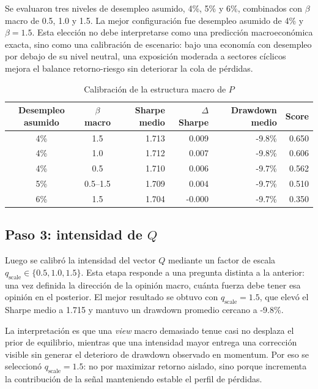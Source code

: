 \documentclass[11pt]{article}
\begin{document}
Se evaluaron tres niveles de desempleo asumido, 4\%, 5\% y 6\%, combinados con $\beta$ macro de 0.5, 1.0 y 1.5. La mejor configuraci\'on fue desempleo asumido de 4\% y $\beta=1.5$. Esta elecci\'on no debe interpretarse como una predicci\'on macroecon\'omica exacta, sino como una calibraci\'on de escenario: bajo una econom\'ia con desempleo por debajo de su nivel neutral, una exposici\'on moderada a sectores c\'iclicos mejora el balance retorno-riesgo sin deteriorar la cola de p\'erdidas.

\begin{table}[H]
\centering
\caption{Calibraci\'on de la estructura macro de $P$}
\label{tab:estructura_p}
\begin{tabular}{c c r r r r}
\toprule
Desempleo asumido & $\beta$ macro & Sharpe medio & $\Delta$ Sharpe & Drawdown medio & Score \\
\midrule
4\% & 1.5 & 1.713 & 0.009 & -9.8\% & 0.650 \\
4\% & 1.0 & 1.712 & 0.007 & -9.8\% & 0.606 \\
4\% & 0.5 & 1.710 & 0.006 & -9.7\% & 0.562 \\
5\% & 0.5--1.5 & 1.709 & 0.004 & -9.7\% & 0.510 \\
6\% & 1.5 & 1.704 & -0.000 & -9.7\% & 0.350 \\
\bottomrule
\end{tabular}
\end{table}

\subsection{Paso 3: intensidad de $Q$}

Luego se calibr\'o la intensidad del vector $Q$ mediante un factor de escala $q_{\text{scale}} \in \{0.5,1.0,1.5\}$. Esta etapa responde a una pregunta distinta a la anterior: una vez definida la direcci\'on de la opini\'on macro, cu\'anta fuerza debe tener esa opini\'on en el posterior. El mejor resultado se obtuvo con $q_{\text{scale}}=1.5$, que elev\'o el Sharpe medio a 1.715 y mantuvo un drawdown promedio cercano a -9.8\%.

La interpretaci\'on es que una \textit{view} macro demasiado tenue casi no desplaza el prior de equilibrio, mientras que una intensidad mayor entrega una correcci\'on visible sin generar el deterioro de drawdown observado en momentum. Por eso se seleccion\'o $q_{\text{scale}}=1.5$: no por maximizar retorno aislado, sino porque incrementa la contribuci\'on de la se\~nal manteniendo estable el perfil de p\'erdidas.
\end{document}
